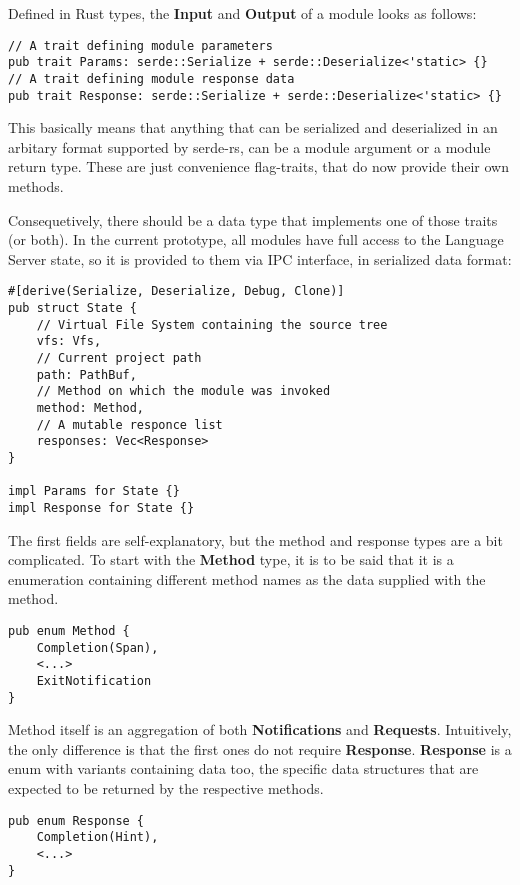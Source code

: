 Defined in Rust types, the \textbf{Input} and \textbf{Output} of a module looks as follows:
\begin{verbatim}
// A trait defining module parameters
pub trait Params: serde::Serialize + serde::Deserialize<'static> {}
// A trait defining module response data
pub trait Response: serde::Serialize + serde::Deserialize<'static> {}
\end{verbatim}
This basically means that anything that can be serialized and deserialized in an arbitary format
supported by serde-rs, can be a module argument or a module return type.
These are just convenience flag-traits, that do now provide their own methods.

Consequetively, there should be a data type that implements one of those traits (or both).
In the current prototype, all modules have full access to the Language Server state, so it is
provided to them via IPC interface, in serialized data format:
\begin{verbatim}
#[derive(Serialize, Deserialize, Debug, Clone)]
pub struct State {
    // Virtual File System containing the source tree
    vfs: Vfs,
    // Current project path
    path: PathBuf,
    // Method on which the module was invoked
    method: Method,
    // A mutable responce list
    responses: Vec<Response>
}

impl Params for State {}
impl Response for State {}

\end{verbatim}

The first fields are self-explanatory, but the method and response types are a bit complicated.
To start with the \textbf{Method} type, it is to be said that it is a enumeration containing
different method names as the data supplied with the method.
\begin{verbatim}
pub enum Method {
    Completion(Span),
    <...>
    ExitNotification
}
\end{verbatim}

Method itself is an aggregation of both \textbf{Notifications}
and \textbf{Requests}. Intuitively, the only difference is that the first ones do not require \textbf{Response}.
\textbf{Response} is a enum with variants containing data too,
the specific data structures that are expected to be returned by the respective methods.
\begin{verbatim}
pub enum Response {
    Completion(Hint),
    <...>
}
\end{verbatim}

